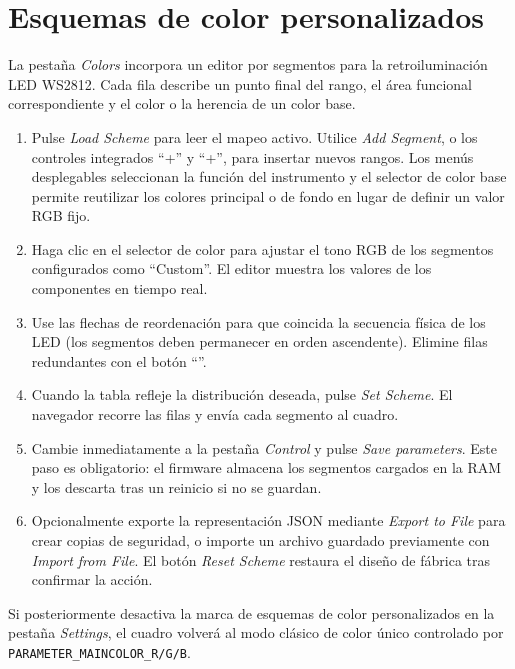 \section{Esquemas de color personalizados}
La pestaña \emph{Colors} incorpora un editor por segmentos para la retroiluminación LED WS2812. Cada fila describe un punto final del rango, el área funcional correspondiente y el color o la herencia de un color base.

\begin{enumerate}
    \item Pulse \emph{Load Scheme} para leer el mapeo activo. Utilice \emph{Add Segment}, o los controles integrados ``+\textuparrow{}'' y ``+\textdownarrow{}'', para insertar nuevos rangos. Los menús desplegables seleccionan la función del instrumento y el selector de color base permite reutilizar los colores principal o de fondo en lugar de definir un valor RGB fijo.
    \item Haga clic en el selector de color para ajustar el tono RGB de los segmentos configurados como ``Custom''. El editor muestra los valores de los componentes en tiempo real.
    \item Use las flechas de reordenación para que coincida la secuencia física de los LED (los segmentos deben permanecer en orden ascendente). Elimine filas redundantes con el botón ``\texttimes{}''.
    \item Cuando la tabla refleje la distribución deseada, pulse \emph{Set Scheme}. El navegador recorre las filas y envía cada segmento al cuadro.
    \item Cambie inmediatamente a la pestaña \emph{Control} y pulse \emph{Save parameters}. Este paso es obligatorio: el firmware almacena los segmentos cargados en la RAM y los descarta tras un reinicio si no se guardan.
    \item Opcionalmente exporte la representación JSON mediante \emph{Export to File} para crear copias de seguridad, o importe un archivo guardado previamente con \emph{Import from File}. El botón \emph{Reset Scheme} restaura el diseño de fábrica tras confirmar la acción.
\end{enumerate}

Si posteriormente desactiva la marca de esquemas de color personalizados en la pestaña \emph{Settings}, el cuadro volverá al modo clásico de color único controlado por \verb|PARAMETER_MAINCOLOR_R/G/B|.
